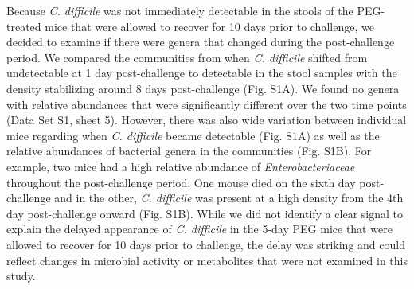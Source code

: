 \documentclass[
  11pt,
]{article}
\begin{document}
Because \emph{C. difficile} was not immediately detectable in the stools
of the PEG-treated mice that were allowed to recover for 10 days prior
to challenge, we decided to examine if there were genera that changed
during the post-challenge period. We compared the communities from when
\emph{C. difficile} shifted from undetectable at 1 day post-challenge to
detectable in the stool samples with the density stabilizing around 8
days post-challenge (Fig. S1A). We found no genera with relative
abundances that were significantly different over the two time points
(Data Set S1, sheet 5). However, there was also wide variation between
individual mice regarding when \emph{C. difficile} became detectable
(Fig. S1A) as well as the relative abundances of bacterial genera in the
communities (Fig. S1B). For example, two mice had a high relative
abundance of \emph{Enterobacteriaceae} throughout the post-challenge
period. One mouse died on the sixth day post-challenge and in the other,
\emph{C. difficile} was present at a high density from the 4th day
post-challenge onward (Fig. S1B). While we did not identify a clear
signal to explain the delayed appearance of \emph{C. difficile} in the
5-day PEG mice that were allowed to recover for 10 days prior to
challenge, the delay was striking and could reflect changes in microbial
activity or metabolites that were not examined in this study.
\end{document}
